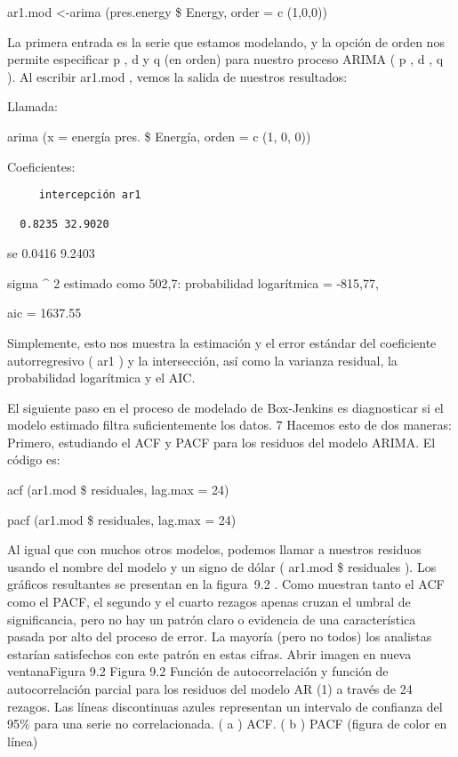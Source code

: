 \documentclass[
]{book}
\begin{document}
ar1.mod \textless-arima (pres.energy \$ Energy, order = c (1,0,0))

La primera entrada es la serie que estamos modelando, y la opción de orden nos permite especificar p , d y q (en orden) para nuestro proceso ARIMA ( p , d , q ). Al escribir ar1.mod , vemos la salida de nuestros resultados:

Llamada:

arima (x = energía pres. \$ Energía, orden = c (1, 0, 0))

Coeficientes:

\begin{verbatim}
     intercepción ar1

  0.8235 32.9020
\end{verbatim}

se 0.0416 9.2403

sigma \^{} 2 estimado como 502,7: probabilidad logarítmica = -815,77,

aic = 1637.55

Simplemente, esto nos muestra la estimación y el error estándar del coeficiente autorregresivo ( ar1 ) y la intersección, así como la varianza residual, la probabilidad logarítmica y el AIC.

El siguiente paso en el proceso de modelado de Box-Jenkins es diagnosticar si el modelo estimado filtra suficientemente los datos. 7 Hacemos esto de dos maneras: Primero, estudiando el ACF y PACF para los residuos del modelo ARIMA. El código es:

acf (ar1.mod \$ residuales, lag.max = 24)

pacf (ar1.mod \$ residuales, lag.max = 24)

Al igual que con muchos otros modelos, podemos llamar a nuestros residuos usando el nombre del modelo y un signo de dólar ( ar1.mod \$ residuales ). Los gráficos resultantes se presentan en la figura  9.2 . Como muestran tanto el ACF como el PACF, el segundo y el cuarto rezagos apenas cruzan el umbral de significancia, pero no hay un patrón claro o evidencia de una característica pasada por alto del proceso de error. La mayoría (pero no todos) los analistas estarían satisfechos con este patrón en estas cifras.
Abrir imagen en nueva ventanaFigura 9.2
Figura 9.2
Función de autocorrelación y función de autocorrelación parcial para los residuos del modelo AR (1) a través de 24 rezagos. Las líneas discontinuas azules representan un intervalo de confianza del 95\% para una serie no correlacionada. ( a ) ACF. ( b ) PACF (figura de color en línea)
\end{document}
